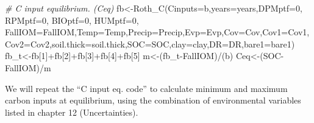 \documentclass[
  10pt,
  b5paper,
]{book}
\newenvironment{Shaded}{\begin{snugshade}}{\end{snugshade}}
\newcommand{\AttributeTok}[1]{\textcolor[rgb]{0.77,0.63,0.00}{#1}}
\newcommand{\CommentTok}[1]{\textcolor[rgb]{0.56,0.35,0.01}{\textit{#1}}}
\newcommand{\DecValTok}[1]{\textcolor[rgb]{0.00,0.00,0.81}{#1}}
\newcommand{\FunctionTok}[1]{\textcolor[rgb]{0.00,0.00,0.00}{#1}}
\newcommand{\NormalTok}[1]{#1}
\newcommand{\OtherTok}[1]{\textcolor[rgb]{0.56,0.35,0.01}{#1}}
\newcommand{\SpecialCharTok}[1]{\textcolor[rgb]{0.00,0.00,0.00}{#1}}
\begin{document}
\begin{Shaded}
\begin{Highlighting}[]
\CommentTok{\# C input equilibrium. (Ceq)}
\NormalTok{fb}\OtherTok{\textless{}{-}}\FunctionTok{Roth\_C}\NormalTok{(}\AttributeTok{Cinputs=}\NormalTok{b,}\AttributeTok{years=}\NormalTok{years,}\AttributeTok{DPMptf=}\DecValTok{0}\NormalTok{, }\AttributeTok{RPMptf=}\DecValTok{0}\NormalTok{, }\AttributeTok{BIOptf=}\DecValTok{0}\NormalTok{, }\AttributeTok{HUMptf=}\DecValTok{0}\NormalTok{, }\AttributeTok{FallIOM=}\NormalTok{FallIOM,}\AttributeTok{Temp=}\NormalTok{Temp,}\AttributeTok{Precip=}\NormalTok{Precip,}\AttributeTok{Evp=}\NormalTok{Evp,}\AttributeTok{Cov=}\NormalTok{Cov,}\AttributeTok{Cov1=}\NormalTok{Cov1,}\AttributeTok{Cov2=}\NormalTok{Cov2,}\AttributeTok{soil.thick=}\NormalTok{soil.thick,}\AttributeTok{SOC=}\NormalTok{SOC,}\AttributeTok{clay=}\NormalTok{clay,}\AttributeTok{DR=}\NormalTok{DR,}\AttributeTok{bare1=}\NormalTok{bare1)}
\NormalTok{fb\_t}\OtherTok{\textless{}{-}}\NormalTok{fb[}\DecValTok{1}\NormalTok{]}\SpecialCharTok{+}\NormalTok{fb[}\DecValTok{2}\NormalTok{]}\SpecialCharTok{+}\NormalTok{fb[}\DecValTok{3}\NormalTok{]}\SpecialCharTok{+}\NormalTok{fb[}\DecValTok{4}\NormalTok{]}\SpecialCharTok{+}\NormalTok{fb[}\DecValTok{5}\NormalTok{]}
\NormalTok{m}\OtherTok{\textless{}{-}}\NormalTok{(fb\_t}\SpecialCharTok{{-}}\NormalTok{FallIOM)}\SpecialCharTok{/}\NormalTok{(b)}
\NormalTok{Ceq}\OtherTok{\textless{}{-}}\NormalTok{(SOC}\SpecialCharTok{{-}}\NormalTok{FallIOM)}\SpecialCharTok{/}\NormalTok{m}
\end{Highlighting}
\end{Shaded}

We will repeat the ``C input eq. code'' to calculate minimum and maximum carbon inputs at equilibrium, using the combination of environmental variables listed in chapter 12 (Uncertainties).
\end{document}
